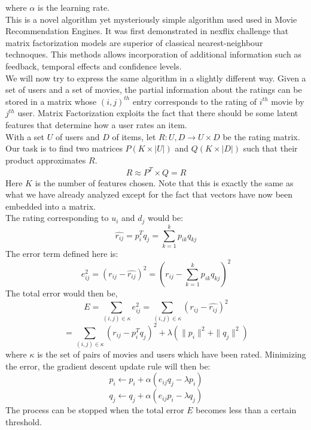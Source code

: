 \documentclass[twocolumn]{article}
\begin{document}
where $\alpha$ is the learning rate.\\
\newline
This is a novel algorithm yet mysteriously simple algorithm used used in Movie Recommendation Engines. It was first demonstrated in nexflix challenge that matrix factorization models are superior of classical nearest-neighbour technoques. This methods allows incorporation of additional information such as feedback, temporal effects and confidence levels.\\
\newline
We will now try to express the same algorithm in a slightly different way. Given a set of users and a set of movies, the partial information about the ratings can be stored in a matrix whose $(i,j)^{th}$ entry corresponds to the rating of $i^{th}$ movie by $j^{th}$ user. Matrix Factorization exploits the fact that there should be some latent features that determine how a user rates an item.\\
\newline
With a set $U$ of users and $D$ of items, let $R : U,D \rightarrow U\times D$ be the rating matrix. Our task is to find two matrices $P (K \times |U|)$ and $Q(K \times |D|)$ such that their product approximates $R$.
$$R\approx P^T \times Q = \hat{R}$$
Here $K$ is the number of features chosen. Note that this is exactly the same as what we have already analyzed except for the fact that vectors have now been embedded into a matrix.\\
\newline
The rating corresponding to $u_i$ and $d_j$ would be:
$$\hat{r_{ij}}=p_i^Tq_j=\displaystyle\sum\limits_{k=1}^kp_{ik}q_{kj}$$
The error term defined here is:
$$e_{ij}^2=(r_{ij}-\hat{r_{ij}})^2=(r_{ij}-\displaystyle\sum\limits_{k=1}^kp_{ik}q_{kj})^2$$
The total error would then be,
$$E=\displaystyle\sum\limits_{(i,j)\in \kappa}e_{ij}^2=\displaystyle\sum\limits_{(i,j)\in \kappa}(r_{ij}-\hat{r_{ij}})^2$$ $$=\displaystyle\sum\limits_{(i,j)\in \kappa}(r_{ij}-p_i^Tq_j)^2+\lambda(\|p_i\|^2+\|q_j\|^2)$$
where $\kappa$ is the set of pairs of movies and users which have been rated.
Minimizing the error, the gradient descent update rule will then be:
$$p_{i} \leftarrow p_{i}+\alpha (e_{ij}q_{j}-\lambda p_i)$$
$$q_{j}\leftarrow q_{j}+\alpha (e_{ij}p_{i}-\lambda q_j)$$
The process can be stopped when the total error $E$ becomes less than a certain threshold.
\end{document}
